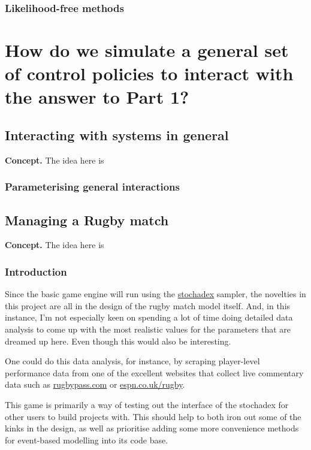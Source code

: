 \documentclass{book}
\begin{document}
\section{\sffamily Likelihood-free methods}


\part*{{ How do we simulate a general set of control policies to interact with the answer to Part 1?}}


\chapter{\sffamily Interacting with systems in general}

{\bfseries\sffamily Concept.} The idea here is 

\section{\sffamily Parameterising general interactions}


\chapter{\sffamily Managing a Rugby match}

{\bfseries\sffamily Concept.} The idea here is 

\section{\sffamily Introduction}

Since the basic game engine will run using the \href{https://github.com/umbralcalc/stochadex}{stochadex} sampler, the novelties in this project are all in the design of the rugby match model itself. And, in this instance, I'm not especially keen on spending a lot of time doing detailed data analysis to come up with the most realistic values for the parameters that are dreamed up here. Even though this would also be interesting.

One could do this data analysis, for instance, by scraping player-level performance data from one of the excellent websites that collect live commentary data such as \href{https://www.rugbypass.com/}{rugbypass.com} or \href{https://www.espn.co.uk/rugby/}{espn.co.uk/rugby}.

This game is primarily a way of testing out the interface of the stochadex for other users to build projects with. This should help to both iron out some of the kinks in the design, as well as prioritise adding some more convenience methods for event-based modelling into its code base.
\end{document}
